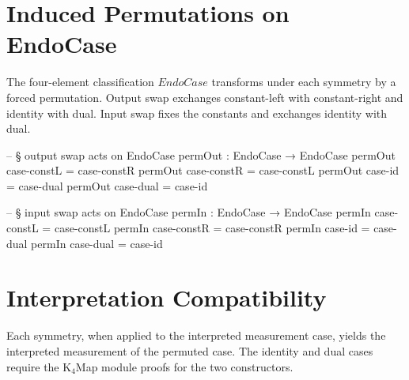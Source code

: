 \documentclass[11pt,a4paper]{book}
\def\texttt#1{#1}%
\begin{document}
\section{Induced Permutations on EndoCase}

The four-element classification $\texttt{EndoCase}$ transforms under each symmetry
by a forced permutation.  Output swap exchanges constant-left with constant-right
and identity with dual.  Input swap fixes the constants and exchanges identity with dual.

\begin{code}
-- § output swap acts on EndoCase
permOut : EndoCase → EndoCase
permOut case-constL = case-constR
permOut case-constR = case-constL
permOut case-id     = case-dual
permOut case-dual   = case-id

-- § input swap acts on EndoCase
permIn : EndoCase → EndoCase
permIn case-constL = case-constL
permIn case-constR = case-constR
permIn case-id     = case-dual
permIn case-dual   = case-id
\end{code}

\section{Interpretation Compatibility}

Each symmetry, when applied to the interpreted measurement case, yields the
interpreted measurement of the permuted case.  The identity and dual cases require
the K$_4$Map module proofs for the two constructors.
\end{document}

